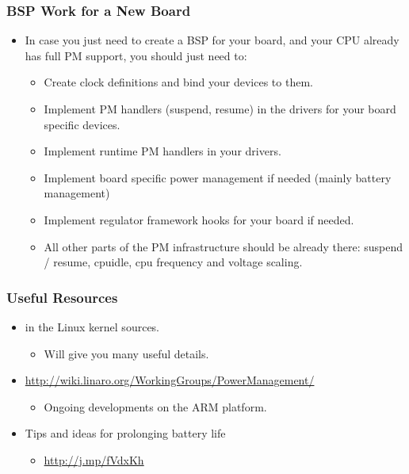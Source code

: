 \begin{frame}
  \frametitle{BSP Work for a New Board}
  \begin{itemize}
  \item In case you just need to create a BSP for your board, and your
    CPU already has full PM support, you should just need to:
    \begin{itemize}
    \item Create clock definitions and bind your devices to them.
    \item Implement PM handlers (suspend, resume) in the drivers for
      your board specific devices.
    \item Implement runtime PM handlers in your drivers.
    \item Implement board specific power management if needed (mainly
      battery management)
    \item Implement regulator framework hooks for your board if
      needed.
    \item All other parts of the PM infrastructure should be already
      there: suspend / resume, cpuidle, cpu frequency and voltage
      scaling.
    \end{itemize}
  \end{itemize}
\end{frame}

\begin{frame}
  \frametitle{Useful Resources}
  \begin{itemize}
  \item {} in the Linux kernel sources.
    \begin{itemize}
    \item Will give you many useful details.
    \end{itemize}
  \item \url{http://wiki.linaro.org/WorkingGroups/PowerManagement/}
    \begin{itemize}
    \item Ongoing developments on the ARM platform.
    \end{itemize}
  \item Tips and ideas for prolonging battery life
    \begin{itemize}
    \item \url{http://j.mp/fVdxKh}
    \end{itemize}
  \end{itemize}
\end{frame}
